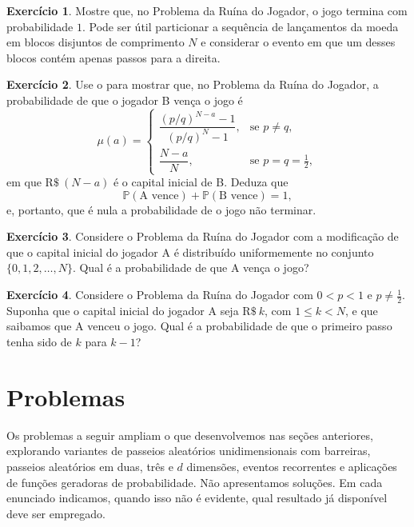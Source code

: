 \documentclass[12pt,portuguese]{article}
\theoremstyle{definition}
\theoremstyle{plainexercise}
\newtheorem{exercise}{Exercício}
\theoremstyle{starredexercise}
\theoremstyle{definition}
\begin{document}
\begin{exercise}\label{exercise:termino-ruina}
  Mostre que, no Problema da Ruína do Jogador, o jogo termina com
  probabilidade $1$. Pode ser útil particionar a sequência de lançamentos da
  moeda em blocos disjuntos de comprimento $N$ e considerar o evento em que um
  desses blocos contém apenas passos para a direita.
\end{exercise}

\begin{exercise}\label{exercise:vitoria-b}
  Use o  para mostrar que, no Problema da Ruína
  do Jogador, a probabilidade de que o jogador B vença o jogo é
  \[
    \mu(a) =
    \begin{cases}
      \dfrac{(p/q)^{N-a} - 1}{(p/q)^N - 1}, & \text{se } p \neq q, \\[0.35cm]
      \dfrac{N - a}{N}, & \text{se } p = q = \tfrac{1}{2},
    \end{cases}
  \]
  em que $\mathrm{R\$}~(N - a)$ é o capital inicial de B. Deduza que
  \[
    \mathbb{P}(\text{A vence}) + \mathbb{P}(\text{B vence}) = 1,
  \]
  e, portanto, que é nula a probabilidade de o jogo não terminar.
\end{exercise}

\begin{exercise}\label{exercise:capital-uniforme}
  Considere o Problema da Ruína do Jogador com a modificação de que o capital
  inicial do jogador A é distribuído uniformemente no conjunto
  $\{0, 1, 2, \ldots, N\}$. Qual é a probabilidade de que A vença o jogo?
\end{exercise}

\begin{exercise}\label{exercise:primeiro-passo-condicional}
  Considere o Problema da Ruína do Jogador com $0 < p < 1$ e
  $p \neq \tfrac{1}{2}$. Suponha que o capital inicial do jogador A seja
  $\mathrm{R\$}~k$, com $1 \leqslant k < N$, e que saibamos que A venceu o
  jogo. Qual é a probabilidade de que o primeiro passo tenha sido de $k$ para
  $k - 1$?
\end{exercise}

\section{Problemas}\label{sec:problemas}

Os problemas a seguir ampliam o que desenvolvemos nas seções anteriores,
explorando variantes de passeios aleatórios unidimensionais com barreiras,
passeios aleatórios em duas, três e $d$ dimensões, eventos recorrentes e
aplicações de funções geradoras de probabilidade. Não apresentamos soluções.
Em cada enunciado indicamos, quando isso não é evidente, qual resultado já
disponível deve ser empregado.
\end{document}

